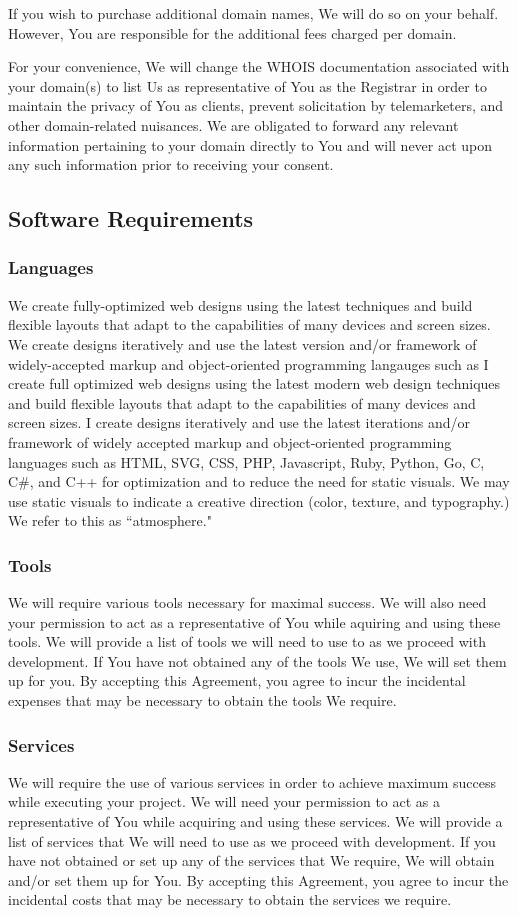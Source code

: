 {  If you wish to purchase additional domain names, We will do so on your behalf. However, You are responsible for the additional fees charged per domain.

  For your convenience, We will change the WHOIS documentation associated with your domain(s) to list Us as representative of You as the Registrar in order to maintain the privacy of You as clients, prevent solicitation by telemarketers, and other domain-related nuisances. We are obligated to forward any relevant information pertaining to your domain directly to You and will never act upon any such information prior to receiving your consent.
  \subsection{Software Requirements}
    \subsubsection{Languages}
    We create fully-optimized web designs using the latest techniques and build flexible layouts that adapt to the capabilities of many devices and screen sizes. We create designs iteratively and use the latest version and/or framework of widely-accepted markup and object-oriented programming langauges such as
    I create full optimized web designs using the latest modern web design techniques and build flexible layouts that adapt to the capabilities of many devices and screen sizes. I create designs iteratively and use the latest iterations and/or framework of widely accepted markup and object-oriented programming languages such as HTML, SVG, CSS, PHP, Javascript, Ruby, Python, Go, C, C#, and C++ for optimization and to reduce the need for static visuals. We may use static visuals to indicate a creative direction (color, texture, and typography.) We refer to this as “atmosphere."
    \subsubsection{Tools}
    We will require various tools necessary for maximal success. We will also need your permission to act as a representative of You while aquiring and using these tools. We will provide a list of tools we will need to use to as we proceed with development. If You have not obtained any of the tools We use, We will set them up for you. By accepting this Agreement, you agree to incur the incidental expenses that may be necessary to obtain the tools We require.
    \subsubsection{Services}
    We will require the use of various services in order to achieve maximum success while executing your project. We will need your permission to act as a representative of You while acquiring and using these services. We will provide a list of services that We will need to use as we proceed with development. If you have not obtained or set up any of the services that We require, We will obtain and/or set them up for You. By accepting this Agreement, you agree to incur the incidental costs that may be necessary to obtain the services we require.

}
